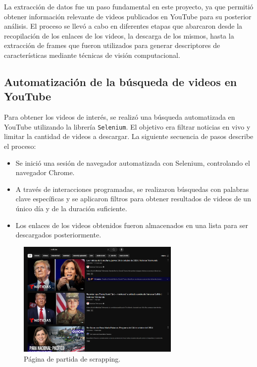 La extracción de datos fue un paso fundamental en este proyecto, ya que permitió obtener información relevante de videos publicados en YouTube para su posterior análisis. El proceso se llevó a cabo en diferentes etapas que abarcaron desde la recopilación de los enlaces de los videos, la descarga de los mismos, hasta la extracción de frames que fueron utilizados para generar descriptores de características mediante técnicas de visión computacional.

\subsection{Automatización de la búsqueda de videos en YouTube}

Para obtener los videos de interés, se realizó una búsqueda automatizada en YouTube utilizando la librería \texttt{Selenium}. El objetivo era filtrar noticias en vivo y limitar la cantidad de videos a descargar. La siguiente secuencia de pasos describe el proceso:

\begin{itemize}
    \item Se inició una sesión de navegador automatizada con Selenium, controlando el navegador Chrome.
    \item A través de interacciones programadas, se realizaron búsquedas con palabras clave específicas y se aplicaron filtros para obtener resultados de videos de un único día y de la duración suficiente.
    \item Los enlaces de los videos obtenidos fueron almacenados en una lista para ser descargados posteriormente.
\end{itemize}

\begin{figure}[H]
    \centering
    \includegraphics[width=0.70\textwidth]{4/figures/Extraccion_1.png}
    \caption{Página de partida de scrapping.}
    \label{fig:convolucion}
\end{figure}

